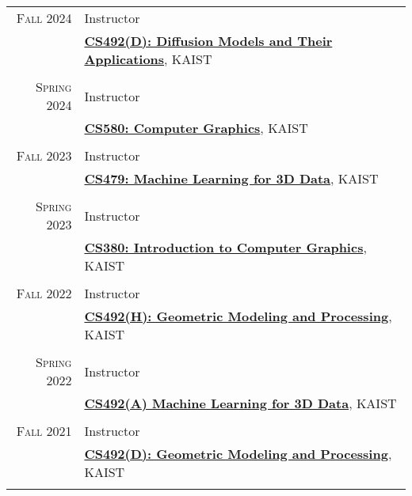 \documentclass[letterpaper,10pt]{article} %
\begin{document}
{{\begin{tabular}{r|p{11cm}}

\textsc{Fall 2024} & Instructor\\
& \href{https://mhsung.github.io/kaist-cs492d-fall-2024/}{\textbf{CS492(D): Diffusion Models and Their Applications}}, KAIST\\
& \\


\textsc{Spring 2024} & Instructor\\
& \href{https://mhsung.github.io/kaist-cs580-spring-2024/}{\textbf{CS580: Computer Graphics}}, KAIST\\
& \\


\textsc{Fall 2023} & Instructor\\
& \href{https://mhsung.github.io/kaist-cs479-fall-2023/}{\textbf{CS479: Machine Learning for 3D Data}}, KAIST\\
& \\


\textsc{Spring 2023} & Instructor\\
& \href{https://mhsung.github.io/kaist-cs380-spring-2023/}{\textbf{CS380: Introduction to Computer Graphics}}, KAIST\\
& \\


\textsc{Fall 2022} & Instructor\\
& \href{https://mhsung.github.io/kaist-cs492h-fall-2022/}{\textbf{CS492(H): Geometric Modeling and Processing}}, KAIST\\
& \\


\textsc{Spring 2022} & Instructor\\
& \href{https://mhsung.github.io/kaist-cs492a-spring-2022/}{\textbf{CS492(A) Machine Learning for 3D Data}}, KAIST\\
& \\


\textsc{Fall 2021} & Instructor\\
& \href{https://mhsung.github.io/kaist-cs492d-fall-2021/}{\textbf{CS492(D): Geometric Modeling and Processing}}, KAIST\\
& \\


\end{tabular}}}
\end{document}
